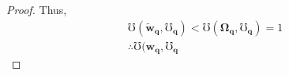 \documentclass[hidelinks, nonatbib]{elsarticle}
\begin{document}
\begin{lemma}
\begin{proof}
        Thus, 
        \begin{gather}
            \mho(
                \boldsymbol{\tilde{w}_{q}},
                \boldsymbol{\mho_q}
            ) 
            < 
            \mho(
                \boldsymbol{\Omega_{q}},
                \boldsymbol{\mho_q}
            ) 
            = 1
            \\
            \therefore
            \mho(
                \boldsymbol{w_{q}},
                \boldsymbol{\mho_q}

\end{gather}
\end{proof}
\end{lemma}
\end{document}
